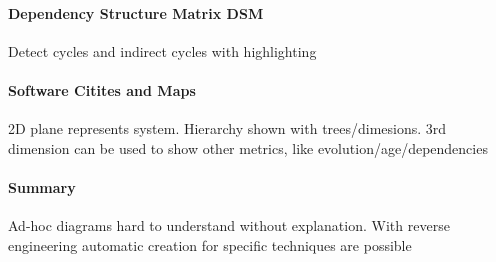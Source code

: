 \documentclass[ngerman]{scrartcl}
\begin{document}
\paragraph{Dependency Structure Matrix DSM}
Detect cycles and indirect cycles with highlighting
\paragraph{Software Citites and Maps}
2D plane represents system. Hierarchy shown with trees/dimesions. 3rd dimension can be used to show other metrics, like evolution/age/dependencies
\paragraph{Summary}
Ad-hoc diagrams hard to understand without explanation. With reverse engineering automatic creation for specific techniques are possible 
\end{document}
